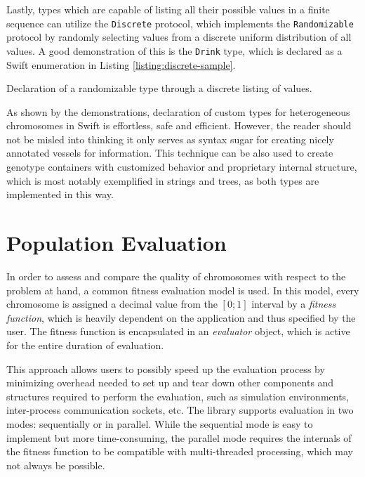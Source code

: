 Lastly, types which are capable of listing all their possible values in a finite sequence can utilize the \texttt{Discrete} protocol, which implements the \texttt{Randomizable} protocol by randomly selecting values from a discrete uniform distribution of all values. A good demonstration of this is the \texttt{Drink} type, which is declared as a Swift enumeration in Listing \ref{listing:discrete-sample}.

\begin{listing}[ht]
	\caption{Declaration of a randomizable type through a discrete listing of values.}
	\label{listing:discrete-sample}
\end{listing}

As shown by the demonstrations, declaration of custom types for heterogeneous chromosomes in Swift is effortless, safe and efficient. However, the reader should not be misled into thinking it only serves as syntax sugar for creating nicely annotated vessels for information. This technique can be also used to create genotype containers with customized behavior and proprietary internal structure, which is most notably exemplified in strings and trees, as both types are implemented in this way.

\section{Population Evaluation}
In order to assess and compare the quality of chromosomes with respect to the problem at hand, a common fitness evaluation model is used. In this model, every chromosome is assigned a decimal value from the $[0;1]$ interval by a \textit{fitness function}, which is heavily dependent on the application and thus specified by the user. The fitness function is encapsulated in an \textit{evaluator} object, which is active for the entire duration of evaluation.

This approach allows users to possibly speed up the evaluation process by minimizing overhead needed to set up and tear down other components and structures required to perform the evaluation, such as simulation environments, inter-process communication sockets, etc. The library supports evaluation in two modes: sequentially or in parallel. While the sequential mode is easy to implement but more time-consuming, the parallel mode requires the internals of the fitness function to be compatible with multi-threaded processing, which may not always be possible.

